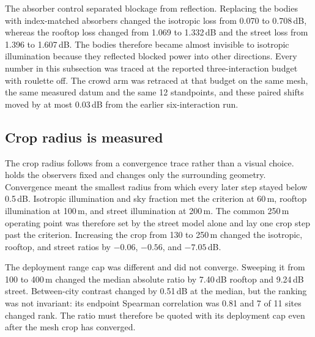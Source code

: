 \documentclass[journal]{IEEEtran}
\begin{document}
The absorber control separated blockage from reflection. Replacing the bodies
with index-matched absorbers changed the isotropic loss from 0.070 to 0.708\,dB,
whereas the rooftop loss changed from 1.069 to 1.332\,dB and the street loss from
1.396 to 1.607\,dB. The bodies therefore became almost invisible to isotropic
illumination because they reflected blocked power into other directions. Every
number in this subsection was traced at the reported three-interaction budget
with roulette off. The crowd arm was retraced at that budget on the same mesh,
the same measured datum and the same 12 standpoints, and these paired shifts
moved by at most 0.03\,dB from the earlier six-interaction run.

\subsection{Crop radius is measured}

The crop radius follows from a convergence trace rather than a visual choice.
 holds the observers fixed and changes only the
surrounding geometry. Convergence meant the smallest radius from which every
later step stayed below 0.5\,dB. Isotropic illumination and sky fraction met the
criterion at 60\,m, rooftop illumination at 100\,m, and street illumination at
200\,m. The common 250\,m operating point was therefore set by the street model
alone and lay one crop step past the criterion. Increasing the crop from 130 to
250\,m changed the isotropic, rooftop, and street ratios by $-0.06$, $-0.56$,
and $-7.05$\,dB.

The deployment range cap was different and did not converge. Sweeping it from
100 to 400\,m changed the median absolute ratio by 7.40\,dB rooftop and 9.24\,dB
street. Between-city contrast changed by 0.51\,dB at the median, but the ranking
was not invariant: its endpoint Spearman correlation was 0.81 and 7 of 11 sites
changed rank. The ratio must therefore be quoted with its deployment cap even
after the mesh crop has converged.
\end{document}
